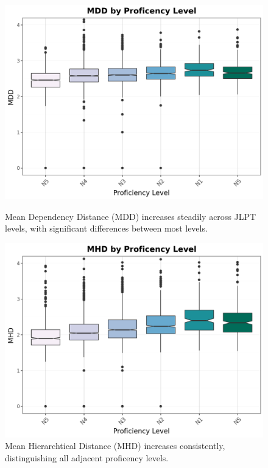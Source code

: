 \begin{figure}[htbp]
    \centering
    \begin{minipage}{.48\textwidth}
        \centering
    \includegraphics[scale=.4]{img/MDD}
    \caption[Mean Dependency Distance across JLPT Proficency Levels]{Mean Dependency Distance (MDD) increases steadily across JLPT levels, with significant differences between most levels.}
        \label{fig:mdd}
    \end{minipage}
    \hfill
\begin{minipage}{.48\textwidth}
        \centering
        \includegraphics[scale=.4]{img/MHD}
        \caption[Mean Hierarchtical Distance across JLPT Proficency Levels]{Mean Hierarchtical Distance (MHD) increases consistently, distinguishing all adjacent proficency levels.}
\label{fig:mhd}
\end{minipage}
    \end{figure}



